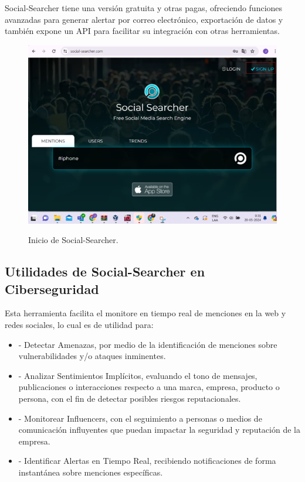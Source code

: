 \documentclass[stu, 11pt, letterpaper, donotrepeattitle, floatsintext, natbib]{apa7}
\begin{document}
Social-Searcher tiene una versión gratuita y otras pagas, ofreciendo funciones avanzadas para generar alertar por correo electrónico, exportación de datos y también expone un API para facilitar su integración con otras herramientas.

\begin{figure}[H]
\centering
\caption{Inicio de Social-Searcher.}
\includegraphics[width=0.75\linewidth]{osi4.png} %
\label{fig:OverallEffect}
\end{figure}

\subsection{Utilidades de Social-Searcher en Ciberseguridad}

Esta herramienta facilita el monitore en tiempo real de menciones en la web y redes sociales, lo cual es de utilidad para:

\begin{itemize}
\item[] - Detectar Amenazas, por medio de la identificación de menciones sobre vulnerabilidades y/o ataques inminentes.
\item[] - Analizar Sentimientos Implícitos, evaluando el tono de mensajes, publicaciones o interacciones respecto a una marca, empresa, producto o persona, con el fin de detectar posibles riesgos reputacionales.
\item[] - Monitorear Influencers, con el seguimiento a personas o medios de comunicación influyentes que puedan impactar la seguridad y reputación de la empresa.
\item[] - Identificar Alertas en Tiempo Real, recibiendo notificaciones de forma instantánea sobre menciones específicas.
\end{itemize}
\end{document}
